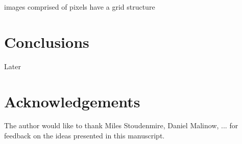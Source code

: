 \documentclass[twocolumn, prl]{revtex4-1}
\begin{document}
 images comprised of pixels have a grid structure



\section{Conclusions}
\label{Sec:conclusions}

Later

\section{Acknowledgements}

The author would like to thank Miles Stoudenmire, Daniel Malinow, ... 
for feedback on the ideas presented in this manuscript.


\vskip -0.2in

%


%



\vskip 0.2in
\end{document}
